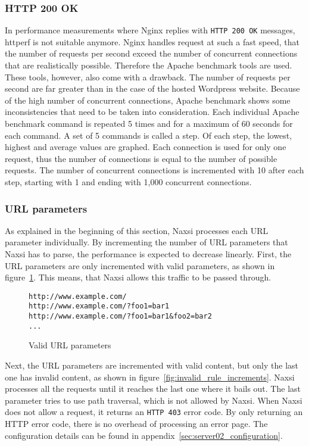 \documentclass[Methods]{subfiles}
\begin{document}
\subsubsection{HTTP 200 OK}
\label{sec:HTTP 200 OK}
In performance measurements where Nginx replies with \verb+HTTP 200 OK+ messages, httperf is not suitable anymore. Nginx handles request at such a fast speed, that the number of requests per second exceed the number of concurrent connections that are realistically possible. Therefore the Apache benchmark tools are used. These tools, however, also come with a drawback. The number of requests per second are far greater than in the case of the hosted Wordpress website. Because of the high number of concurrent connections, Apache benchmark shows some inconsistencies that need to be taken into consideration. Each individual Apache benchmark command is repeated 5 times and for a maximum of 60 seconds for each command. A set of 5 commands is called a step. Of each step, the lowest, highest and average values are graphed. Each connection is used for only one request, thus the number of connections is equal to the number of possible requests. The number of concurrent connections is incremented with 10 after each step, starting with 1 and ending with 1,000 concurrent connections.

\subsubsection{URL parameters}
As explained in the beginning of this section, Naxsi processes each \ac{URL} parameter individually. By incrementing the number of \ac{URL} parameters that Naxsi has to parse, the performance is expected to decrease linearly. First, the \ac{URL} parameters are only incremented with valid parameters, as shown in figure~\ref{fig:valid_rule_increments}. This means, that Naxsi allows this traffic to be passed through. 

\begin{figure}[H]
\caption{Valid URL parameters}
\begin{verbatim}
http://www.example.com/
http://www.example.com/?foo1=bar1
http://www.example.com/?foo1=bar1&foo2=bar2
...
\end{verbatim}
\label{fig:valid_rule_increments}
\end{figure}

Next, the \ac{URL} parameters are incremented with valid content, but only the last one has invalid content, as shown in figure~\ref{fig:invalid_rule_increments}. Naxsi processes all the requests until it reaches the last one where it bails out. The last parameter tries to use path traversal, which is not allowed by Naxsi. When Naxsi does not allow a request, it returns an \verb+HTTP 403+ error code. By only returning an HTTP error code, there is no overhead of processing an error page. The configuration details can be found in appendix~\ref{sec:server02_configuration}.
\end{document}
